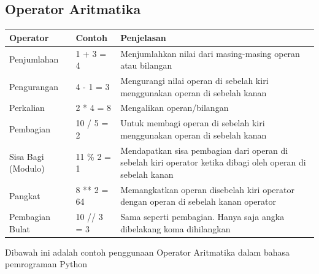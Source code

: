 \subsection{Operator Aritmatika}
\begin{center}
\begin{tabular}{ | m{2cm} | m{2cm} | m{7cm} | }
\hline
Operator & Contoh & Penjelasan \\
\hline
Penjumlahan & 1 + 3 = 4 & Menjumlahkan nilai dari masing-masing operan atau bilangan \\
\hline
Pengurangan & 4 - 1 = 3 & Mengurangi nilai operan di sebelah kiri menggunakan operan di sebelah kanan \\
\hline
Perkalian & 2 * 4 = 8 & Mengalikan operan/bilangan \\
\hline
Pembagian & 10 / 5 = 2 & Untuk membagi operan di sebelah kiri menggunakan operan di sebelah kanan \\
\hline
Sisa Bagi (Modulo) & 11 \% 2 = 1 & Mendapatkan sisa pembagian dari operan di sebelah kiri operator ketika dibagi oleh operan di sebelah kanan \\
\hline
Pangkat & 8 ** 2 = 64 & Memangkatkan operan disebelah kiri operator dengan operan di sebelah kanan operator \\
\hline
Pembagian Bulat & 10 // 3 = 3 & Sama seperti pembagian. Hanya saja angka dibelakang koma dihilangkan \\
\hline
\end{tabular}
\end{center}
Dibawah ini adalah contoh penggunaan Operator Aritmatika dalam bahasa pemrograman Python


